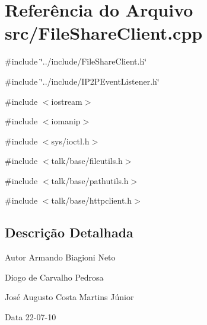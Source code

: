 \section{Referência do Arquivo src/FileShareClient.cpp}
\label{FileShareClient_8cpp}
{\ttfamily \#include \char`\"{}../include/FileShareClient.h\char`\"{}}\par
{\ttfamily \#include \char`\"{}../include/IP2PEventListener.h\char`\"{}}\par
{\ttfamily \#include $<$iostream$>$}\par
{\ttfamily \#include $<$iomanip$>$}\par
{\ttfamily \#include $<$sys/ioctl.h$>$}\par
{\ttfamily \#include $<$talk/base/fileutils.h$>$}\par
{\ttfamily \#include $<$talk/base/pathutils.h$>$}\par
{\ttfamily \#include $<$talk/base/httpclient.h$>$}\par


\subsection{Descrição Detalhada}
\begin{DoxyAuthor}{Autor}
Armando Biagioni Neto 

Diogo de Carvalho Pedrosa 

José Augusto Costa Martins Júnior 
\end{DoxyAuthor}
\begin{DoxyDate}{Data}
22-\/07-\/10 
\end{DoxyDate}

